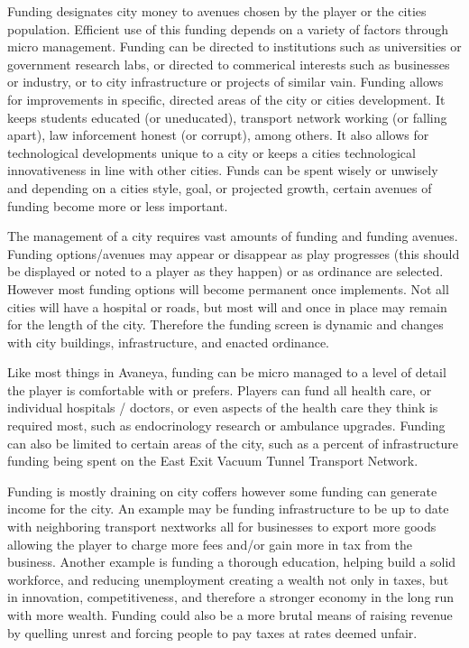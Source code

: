 
Funding designates city money to avenues chosen by the player or the cities population. Efficient use of this funding depends on a variety of factors through micro management. Funding can be directed to institutions such as universities or government research labs, or directed to commerical interests such as businesses or industry, or to city infrastructure or projects of similar vain. Funding allows for improvements in specific, directed areas of the city or cities development. It keeps students educated (or uneducated), transport network working (or falling apart), law inforcement honest (or corrupt), among others. It also allows for technological developments unique to a city or keeps a cities technological innovativeness in line with other cities. Funds can be spent wisely or unwisely and depending on a cities style, goal, or projected growth, certain avenues of funding become more or less important.

The management of a city requires vast amounts of funding and funding avenues. Funding options/avenues may appear or disappear as play progresses (this should be displayed or noted to a player as they happen) or as ordinance are selected. However most funding options will become permanent once implements. Not all cities will have a hospital or roads, but most will and once in place may remain for the length of the city. Therefore the funding screen is dynamic and changes with city buildings, infrastructure, and enacted ordinance.

Like most things in Avaneya, funding can be micro managed to a level of detail the player is comfortable with or prefers. Players can fund all health care, or individual hospitals / doctors, or even aspects of the health care they think is required most, such as endocrinology research or ambulance upgrades. Funding can also be limited to certain areas of the city, such as a percent of infrastructure funding being spent on the East Exit Vacuum Tunnel Transport Network.

Funding is mostly draining on city coffers however some funding can generate income for the city. An example may be funding infrastructure to be up to date with neighboring transport nextworks all for businesses to export more goods allowing the player to charge more fees and/or gain more in tax from the business. Another example is funding a thorough education, helping build a solid workforce, and reducing unemployment creating a wealth not only in taxes, but in innovation, competitiveness, and therefore a stronger economy in the long run with more wealth. Funding could also be a more brutal means of raising revenue by quelling unrest and forcing people to pay taxes at rates deemed unfair.


